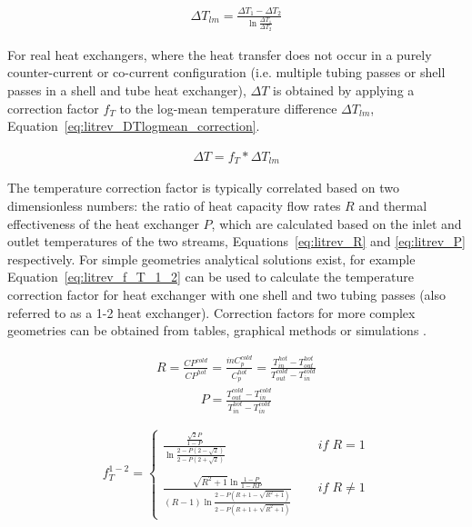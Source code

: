     \begin{align}
        \Delta T_{lm} = \frac{\Delta T_1 - \Delta T_2}{\ln \frac{\Delta T_1}{\Delta T_2}}\label{eq:litrev_DTlogmean}
    \end{align}   

    For real heat exchangers, where the heat transfer does not occur in a purely counter-current or co-current configuration (i.e. multiple tubing passes or shell passes in a shell and tube heat exchanger), \(\Delta T\) is obtained by applying a correction factor \(f_{T}\) to the log-mean temperature difference \(\Delta T_{lm}\), Equation~\ref{eq:litrev_DTlogmean_correction}.  

    \begin{align}
        \Delta T = f_{T}*\Delta T_{lm}\label{eq:litrev_DTlogmean_correction}
    \end{align}  

    The temperature correction factor is typically correlated based on two dimensionless numbers: the ratio of heat capacity flow rates \(R\) and thermal effectiveness of the heat exchanger \(P\), which are calculated based on the inlet and outlet temperatures of the two streams, Equations~\ref{eq:litrev_R} and \ref{eq:litrev_P} respectively. For simple geometries analytical solutions exist, for example Equation~\ref{eq:litrev_f_T_1_2} can be used to calculate the temperature correction factor for heat exchanger with one shell and two tubing passes (also referred to as a 1-2 heat exchanger). Correction factors for more complex geometries can be obtained from tables, graphical methods or simulations \cite{Smith2005}.

    \begin{align}
        R = \frac{CP^{cold}}{CP^{hot}} = \frac{\Dot{m}C_p^{cold}}{C_p^{hot}} = \frac{T_{in}^{hot} - T_{out}^{hot}}{T_{out}^{cold} - T_{in}^{cold}} \label{eq:litrev_R}
    \end{align}
    \begin{align}
        P = \frac{T_{out}^{cold} - T_{in}^{cold}}{T_{in}^{hot} - T_{in}^{cold}} \label{eq:litrev_P}
    \end{align}

    \begin{equation}
        \label{eq:litrev_f_T_1_2}
        f_T^{1-2} = \left\{
        \begin{aligned}
        \frac{\frac{\sqrt{2}P}{1-P}}{\ln\frac{2-P(2-\sqrt{2})}{2-P(2+\sqrt{2})}} \quad\quad\quad\quad\;& if\; R = 1\\
        & \\
        \frac{\sqrt{R^2+1}\ln\frac{1-P}{1-RP}}{(R-1)\ln\frac{2-P(R+1-\sqrt{R^2+1})}{2-P(R+1+\sqrt{R^2+1})}}\quad\; & if\; R \neq 1
        \end{aligned}
        \right.
    \end{equation}


